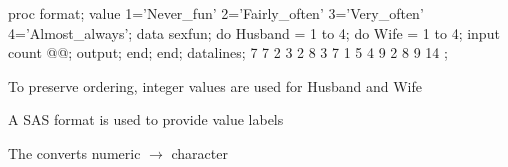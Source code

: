 \renewcommand{\FileName}{agree-Sex-SAS}
\begin{frame}[fragile]
\frametitle{}
\begin{Input}[gobble=1,baselinestretch=0.8,fontsize=\footnotesize]
 proc format;
  value  1='Never_fun' 2='Fairly_often' 
               3='Very_often' 4='Almost_always';
 data sexfun;
   do Husband = 1 to 4;
   do Wife    = 1 to 4;
     input count @@;
     output;
     end; end;
 datalines;
  7     7     2      3
  2     8     3      7
  1     5     4      9
  2     8     9     14
 ;

\end{Input}
\begin{itemize*}
 \item To preserve ordering, integer values are used for Husband and Wife
 \item A SAS format is used to provide value labels
 \item The  converts numeric $\rightarrow$ character
\end{itemize*}

\end{frame}